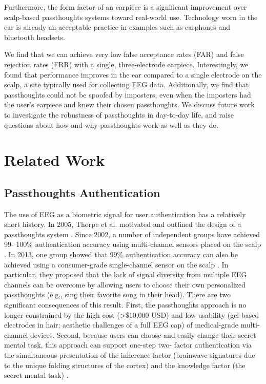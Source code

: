 \documentclass{sigchi}
\begin{document}
Furthermore, the form factor of an earpiece is a significant improvement over scalp-based passthoughts systems toward real-world use. Technology worn in the ear is already an acceptable practice in examples such as earphones and bluetooth headsets.

We find that we can achieve very low false acceptance rates (FAR) and false rejection rates (FRR) with a single, 
three-electrode earpiece. Interestingly, we found that performance improves in the ear compared to a single electrode on the scalp, a site typically used for collecting EEG data. Additionally, we find that passthoughts could not be spoofed by imposters, even when the imposters had the user's earpiece and knew their chosen passthoughts. We discuss future work to investigate the robustness of passthoughts in day-to-day life, and raise questions about how and why passthoughts work as well as they do.

\section{Related Work}

\subsection{Passthoughts Authentication}
The use of EEG as a biometric signal for user authentication has a relatively short history.
In 2005, Thorpe et al. motivated and outlined the design of a passthoughts system \cite{Thorpe2005}.
Since 2002, a number of independent groups have achieved 99-
100\% authentication accuracy using multi-channel sensors placed on the scalp \cite{Poulos2002,Marcel2007a,Palaniappan2008,Ashby2011}.
In 2013, one group showed that 99\% authentication accuracy can also be
achieved using a consumer-grade single-channel sensor on the scalp \cite{Chuang2013b}. In particular, they proposed that the
lack of signal diversity from multiple EEG channels can be overcome by allowing users to choose their own personalized passthoughts (e.g., sing their favorite song in their head). There are two significant consequences of this result. First,
the passthoughts approach is no longer constrained by the high cost (\textgreater \$10,000 USD)
and low usability (gel-based electrodes in hair; aesthetic challenges of a full EEG cap) of
medical-grade multi-channel devices. Second, because users can choose and
easily change their secret mental task, this approach can support one-step two-
factor authentication via the simultaneous presentation of the inherence factor
(brainwave signatures due to the unique folding structures of the cortex) and the
knowledge factor (the secret mental task) \cite{Chuang2014}.
\end{document}
